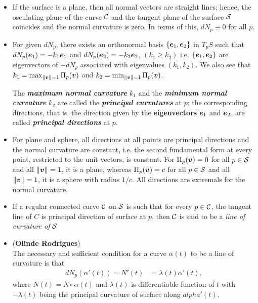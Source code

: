 \documentclass[11pt]{article}
\begin{document}
\begin{itemize}
\item If the surface is a plane, then all normal vectors are straight lines; hence, the  osculating plane of the curve ${\mathcal C}$ and the tangent plane of the surface ${\mathcal S}$ coincides and the normal curvature is zero. In terms of this, $dN_{p} \equiv 0$ for all $p$.

\item For given $dN_{p}$, there exists an orthonormal basis $\left\{\boldsymbol{e}_{1}, \boldsymbol{e}_{2}\right\}$ in $T_{p}S$ such that $dN_{p}(\boldsymbol{e}_{1}) = -k_{1}\boldsymbol{e}_{1}$ and  $dN_{p}(\boldsymbol{e}_{2}) = -k_{2}\boldsymbol{e}_{2}$, $(k_{1}\ge k_{2})$ i.e. $\left\{\boldsymbol{e}_{1}, \boldsymbol{e}_{2}\right\}$ are eigenvectors of $-dN_{p}$ associated with eigenvalues $(k_{1}, k_{2})$. We also see that 
$k_{1} = \max_{\left\|\boldsymbol{v}\right\|_{} = 1 }\Pi_{p}(\boldsymbol{v})$ and $k_{2} = \min_{\left\|\boldsymbol{v}\right\|_{} = 1 }\Pi_{p}(\boldsymbol{v})$.

\begin{definition}
The \emph{\textbf{maximum normal curvature}} $k_{1}$ and the \emph{\textbf{minimum normal curvature}} $k_{2}$ are called the \emph{\textbf{principal curvatures}} at $p$; the corresponding directions, that is, the direction given by the \textbf{eigenvectors} $\boldsymbol{e}_{1}$ and $\boldsymbol{e}_{2}$, are called \emph{\textbf{principal directions}} at $p$.
\end{definition}

\item For plane and sphere, all directions at all points are principal directions and the normal curvature are constant, i.e. the second fundamental form at every point, restricted to the unit vectors, is constant. For $\Pi_{p}(\boldsymbol{v}) = 0$ for all $p\in {\mathcal S}$ and all $\left\|\boldsymbol{v}\right\|_{} = 1$, it is a plane, whereas  $\Pi_{p}(\boldsymbol{v}) = c$ for all $p\in {\mathcal S}$ and all $\left\|\boldsymbol{v}\right\|_{} = 1$, it is a sphere with radius $1/c$. All directions are extremals for the normal curvature.

\item \begin{definition}
If a regular connected curve ${\mathcal C}$ on ${\mathcal S}$ is such that for every $p\in {\mathcal C}$, the tangent line of $C$ is principal direction of surface at $p$, then ${\mathcal C}$ is said to be a \emph{line of curvature of} ${\mathcal S}$
\end{definition}

\item \begin{proposition} (\textbf{Olinde Rodrigues})\\
The necessary and sufficient condition for a curve $\alpha(t)$ to be a line of curvature is that
\begin{align*}
dN_{p}(\alpha'(t)) = N'(t) &= \lambda(t)\alpha'(t), 
\end{align*}where $N(t) = N\circ \alpha(t)$ and $
\lambda(t)$ is differentiable function of $t$ with $-\lambda(t)$ being the principal curvature of surface along $alpha'(t)$.
\end{proposition}


\end{itemize}
\end{document}
